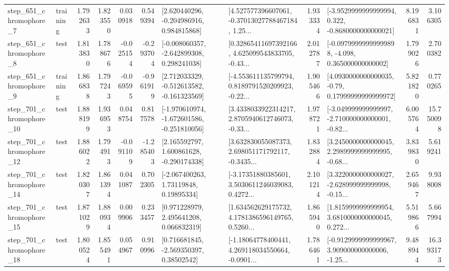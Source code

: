 \begin{tabular}{llrrrrllrlrr}
   step\_651\_chromophore\_7 &  training &      1.792633 &    1.823550 &      0.030918 &  0.549394 &    [2.620440296, -0.204986916, 0.984815868] &  [4.527577396607061, -0.37013027788467184, 1.25... &       1.933334 &  [-3.9529999999999994, 0.322, -0.8680000000000021] &            8.196831 &          3.106305 \\
   step\_651\_chromophore\_8 &      test &      1.813830 &    1.788676 &     -0.025154 & -0.293704 &   [-0.008060357, -2.642899308, 0.298241038] &  [0.32865411697392166, 4.625099543833705, -0.43... &       2.012787 &  [-0.09799999999999898, -4.098, 0.365000000000002] &            1.799026 &          2.700382 \\
   step\_651\_chromophore\_9 &  training &      1.866838 &    1.797243 &     -0.069595 & -0.961919 &   [2.712033329, -0.512613582, -0.161323569] &  [-4.553611135799794, 0.8189791520209923, -0.22... &       1.905466 &   [4.0930000000000035, -0.79, 0.17999999999999972] &            5.821820 &          0.770265 \\
  step\_701\_chromophore\_10 &      test &      1.888199 &    1.936953 &      0.048754 &  0.817578 &  [-1.970610974, -1.672601586, -0.251810056] &  [3.4338033922314217, 2.8705940612746073, -0.33... &       1.978721 &  [-3.049999999999997, -2.710000000000001, -0.82... &            6.005764 &         15.750098 \\
  step\_701\_chromophore\_12 &      test &      1.886022 &    1.794913 &     -0.091109 & -1.285403 &    [2.165592797, 1.600861628, -0.290174338] &  [3.632830055087373, 2.698051171792117, -0.3435... &       1.832884 &  [3.2450000000000045, 2.2989999999999995, -0.68... &            3.839830 &          5.619241 \\
  step\_701\_chromophore\_14 &      test &      1.820307 &    1.861394 &      0.041087 &  0.702305 &      [-2.067400263, 1.73119848, 0.19895334] &  [-3.17351880385601, 3.5030611246039083, 0.4272... &       2.101214 &  [3.3220000000000027, -2.628999999999998, -0.15... &            2.659467 &          9.938008 \\
  step\_701\_chromophore\_15 &      test &      1.871029 &    1.880934 &      0.009906 &  0.233457 &     [0.971228979, 2.495641208, 0.066832319] &  [1.634562629175732, 4.1781386596149765, 0.5260... &       1.865940 &  [1.8159999999999954, 3.6810000000000045, 0.272... &            5.519866 &          5.667994 \\
  step\_701\_chromophore\_18 &      test &      1.800524 &    1.855491 &      0.054967 &  0.910996 &     [0.716681845, -2.569350397, 0.38502542] &  [-1.18064778400441, 4.269118034550664, -0.0901... &       1.786461 &  [-0.9129999999999967, 3.909000000000006, -1.25... &            9.488944 &         16.393173 \\

\end{tabular}
